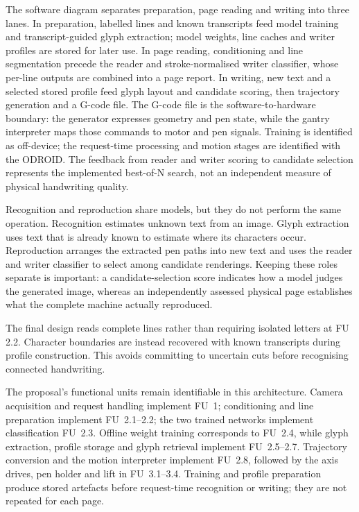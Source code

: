 \noindent\begin{minipage}{\linewidth}
The software diagram separates preparation, page reading and writing into three lanes. In preparation, labelled lines and known transcripts feed model training and transcript-guided glyph extraction; model weights, line caches and writer profiles are stored for later use. In page reading, conditioning and line segmentation precede the reader and stroke-normalised writer classifier, whose per-line outputs are combined into a page report. In writing, new text and a selected stored profile feed glyph layout and candidate scoring, then trajectory generation and a G-code file. The G-code file is the software-to-hardware boundary: the generator expresses geometry and pen state, while the gantry interpreter maps those commands to motor and pen signals. Training is identified as off-device; the request-time processing and motion stages are identified with the ODROID. The feedback from reader and writer scoring to candidate selection represents the implemented best-of-N search, not an independent measure of physical handwriting quality.
\end{minipage}

Recognition and reproduction share models, but they do not perform the same operation. Recognition estimates unknown text from an image. Glyph extraction uses text that is already known to estimate where its characters occur. Reproduction arranges the extracted pen paths into new text and uses the reader and writer classifier to select among candidate renderings. Keeping these roles separate is important: a candidate-selection score indicates how a model judges the generated image, whereas an independently assessed physical page establishes what the complete machine actually reproduced.

The final design reads complete lines rather than requiring isolated letters at FU 2.2. Character boundaries are instead recovered with known transcripts during profile construction. This avoids committing to uncertain cuts before recognising connected handwriting.

The proposal's functional units remain identifiable in this architecture. Camera acquisition and request handling implement FU~1; conditioning and line preparation implement FU~2.1--2.2; the two trained networks implement classification FU~2.3. Offline weight training corresponds to FU~2.4, while glyph extraction, profile storage and glyph retrieval implement FU~2.5--2.7. Trajectory conversion and the motion interpreter implement FU~2.8, followed by the axis drives, pen holder and lift in FU~3.1--3.4. Training and profile preparation produce stored artefacts before request-time recognition or writing; they are not repeated for each page.

